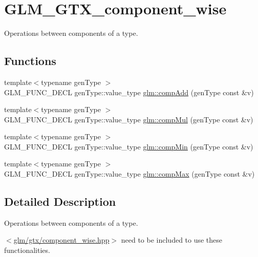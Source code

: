 \hypertarget{group__gtx__component__wise}{}\section{G\+L\+M\+\_\+\+G\+T\+X\+\_\+component\+\_\+wise}
\label{group__gtx__component__wise}


Operations between components of a type.  


\subsection*{Functions}
\begin{DoxyCompactItemize}
\item 
{\footnotesize template$<$typename gen\+Type $>$ }\\G\+L\+M\+\_\+\+F\+U\+N\+C\+\_\+\+D\+E\+CL gen\+Type\+::value\+\_\+type \hyperlink{group__gtx__component__wise_gaf71833350e15e74d31cbf8a3e7f27051}{glm\+::comp\+Add} (gen\+Type const \&v)
\item 
{\footnotesize template$<$typename gen\+Type $>$ }\\G\+L\+M\+\_\+\+F\+U\+N\+C\+\_\+\+D\+E\+CL gen\+Type\+::value\+\_\+type \hyperlink{group__gtx__component__wise_gae8ab88024197202c9479d33bdc5a8a5d}{glm\+::comp\+Mul} (gen\+Type const \&v)
\item 
{\footnotesize template$<$typename gen\+Type $>$ }\\G\+L\+M\+\_\+\+F\+U\+N\+C\+\_\+\+D\+E\+CL gen\+Type\+::value\+\_\+type \hyperlink{group__gtx__component__wise_gab5d0832b5c7bb01b8d7395973bfb1425}{glm\+::comp\+Min} (gen\+Type const \&v)
\item 
{\footnotesize template$<$typename gen\+Type $>$ }\\G\+L\+M\+\_\+\+F\+U\+N\+C\+\_\+\+D\+E\+CL gen\+Type\+::value\+\_\+type \hyperlink{group__gtx__component__wise_gabfa4bb19298c8c73d4217ba759c496b6}{glm\+::comp\+Max} (gen\+Type const \&v)
\end{DoxyCompactItemize}


\subsection{Detailed Description}
Operations between components of a type. 

$<$\hyperlink{component__wise_8hpp}{glm/gtx/component\+\_\+wise.\+hpp}$>$ need to be included to use these functionalities. 

